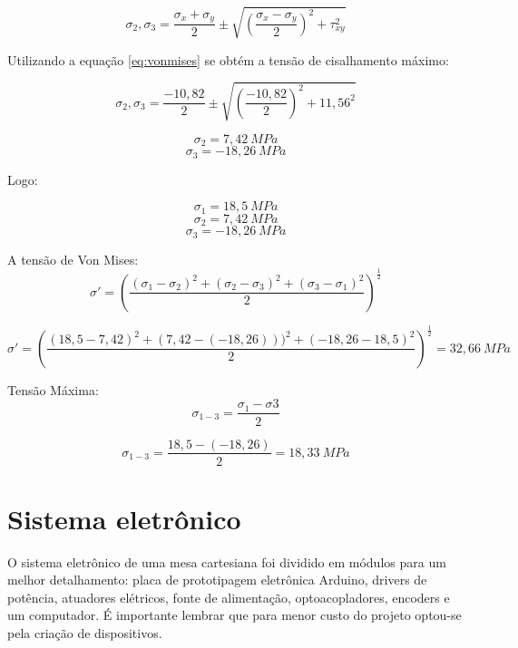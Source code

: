 \begin{equation}\label{eq:vonmises}
\sigma_{2}, \sigma_{3} = \frac{\sigma_{x} + \sigma_{y}}{2} \pm \sqrt{(\frac{\sigma_{x} - \sigma_{y}}{2})^2 + \tau_{xy}^{2}}
\end{equation}

Utilizando a equação \ref{eq:vonmises} se obtém a tensão de cisalhamento máximo:

$$\sigma_{2}, \sigma_{3} = \frac{-10,82}{2} \pm \sqrt{(\frac{-10,82}{2})^2 + 11,56^{2}}$$

$$\sigma_{2} = 7,42~MPa$$
$$\sigma_{3} = -18,26~MPa$$

Logo:

$$\sigma_{1} = 18,5~MPa$$
$$\sigma_{2} = 7,42~MPa$$
$$\sigma_{3} = -18,26~MPa$$

A tensão de Von Mises:
\begin{equation}
\sigma' = (\frac{(\sigma_{1} - \sigma_{2})^{2} + (\sigma_{2} - \sigma_{3})^{2} + (\sigma_{3} - \sigma_{1})^{2}}{2})^{\frac{1}{2}}
\end{equation}

$$\sigma' = (\frac{(18,5 - 7,42)^{2} + (7,42 - (-18,26)))^{2} + (-18,26 - 18,5)^{2}}{2})^{\frac{1}{2}} = 32,66~MPa$$

Tensão Máxima:
\begin{equation}\label{eq:tensaomaxima}
\sigma_{1-3} = \frac{\sigma_{1} - \sigma{3}}{2}
\end{equation}

$$\sigma_{1-3} = \frac{18,5 - (-18,26)}{2} = 18,33~MPa$$

\section{Sistema eletrônico}\label{sec:metsisele}

O sistema eletrônico de uma mesa cartesiana foi dividido em módulos para um melhor detalhamento: 
placa de prototipagem eletrônica Arduino, drivers de potência, atuadores elétricos, fonte de alimentação, 
optoacopladores, encoders e um computador. É importante lembrar que para menor custo do projeto optou-se 
pela criação de dispositivos.

